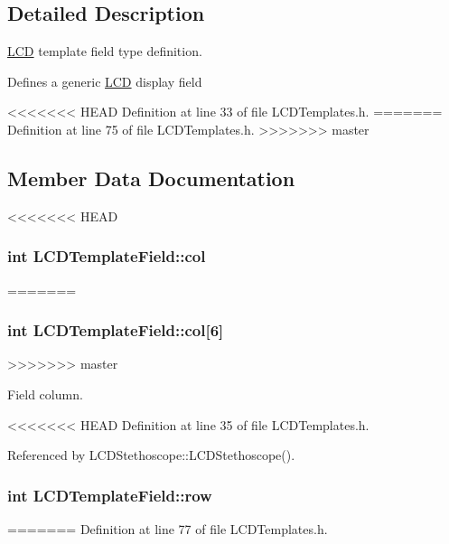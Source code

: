 \subsection{Detailed Description}
\hyperlink{class_l_c_d}{L\-C\-D} template field type definition. 

Defines a generic \hyperlink{class_l_c_d}{L\-C\-D} display field 

<<<<<<< HEAD
Definition at line 33 of file L\-C\-D\-Templates.\-h.
=======
Definition at line 75 of file L\-C\-D\-Templates.\-h.
>>>>>>> master



\subsection{Member Data Documentation}
<<<<<<< HEAD
\hypertarget{struct_l_c_d_template_field_a5dec4293e8f4f297609c83e8612c3f06}{
\subsubsection[{col}]{\setlength{\rightskip}{0pt plus 5cm}int L\-C\-D\-Template\-Field\-::col}}\label{struct_l_c_d_template_field_a5dec4293e8f4f297609c83e8612c3f06}
=======
\hypertarget{struct_l_c_d_template_field_acf04ebae1e6cd326e3b4237cb73bb23d}{
\subsubsection[{col}]{\setlength{\rightskip}{0pt plus 5cm}int L\-C\-D\-Template\-Field\-::col\mbox{[}6\mbox{]}}}\label{struct_l_c_d_template_field_acf04ebae1e6cd326e3b4237cb73bb23d}
>>>>>>> master


Field column. 



<<<<<<< HEAD
Definition at line 35 of file L\-C\-D\-Templates.\-h.



Referenced by L\-C\-D\-Stethoscope\-::\-L\-C\-D\-Stethoscope().

\hypertarget{struct_l_c_d_template_field_a842db0224937e139c4ff9f9a6da123e6}{
\subsubsection[{row}]{\setlength{\rightskip}{0pt plus 5cm}int L\-C\-D\-Template\-Field\-::row}}\label{struct_l_c_d_template_field_a842db0224937e139c4ff9f9a6da123e6}
=======
Definition at line 77 of file L\-C\-D\-Templates.\-h.



